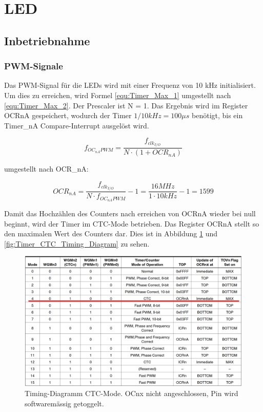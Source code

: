 \section{LED}
\subsection{Inbetriebnahme}
\subsubsection{PWM-Signale}\label{Appendix:Timer_PWM}

Das PWM-Signal für die LEDs wird mit einer Frequenz von 10 kHz initialisiert. Um dies zu erreichen, wird Formel \ref{equ:Timer_Max_1} umgestellt nach \ref{equ:Timer_Max_2}. Der Prescaler ist N = 1. Das Ergebnis wird im Register OCRnA gespeichert, wodurch der Timer $1/10kHz = 100\mu s$ benötigt, bis ein Timer\_nA Compare-Interrupt ausgelöst wird. \cite[S.148]{atmel_atmel_2014}

\begin{equation}
f_{OC_{nA}PWM} = \frac{f_{clk_{I/O}}}{N \cdot (1+OCR_{nA})}
\label{equ:Timer_Max_1}
\end{equation}

umgestellt nach OCR\_nA:

\begin{equation}
OCR_{nA} = \frac{f_{clk_{I/O}}}{N \cdot f_{OC_{nA}PWM}} - 1 = \frac{16MHz}{1 \cdot 10kHz} - 1 = 1599
\label{equ:Timer_Max_2}
\end{equation}

Damit das Hochzählen des Counters nach erreichen von OCRnA wieder bei null beginnt, wird der Timer im CTC-Mode betrieben. Das Register OCRnA stellt so den maximalen Wert des Counters dar. Dies ist in Abbildung \ref {fig:Timer_CTC_Mode} und \ref{fig:Timer_CTC_Timing_Diagram} zu sehen.

\begin{figure}[H]
	\centering
	\includegraphics[width=\textwidth]{graphics/Timer_CTC_Mode}
	\caption{Timing-Diagramm CTC-Mode. OCnx nicht angeschlossen, Pin wird softwaremässig getoggelt.\cite[S.145]{atmel_atmel_2014}}
	\label{fig:Timer_CTC_Mode}
\end{figure}

